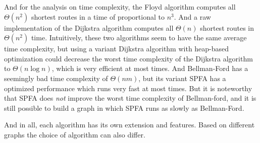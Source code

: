 \documentclass[a4paper,11pt,twocolumn]{article}
\begin{document}
And for the analysis on time complexity, the Floyd algorithm computes all $\Theta(n^2)$ shortest routes in a time of proportional to $n^3$. And a raw implementation of the Dijkstra algorithm computes all $\Theta(n)$ shortest routes in $\Theta(n^2)$ time. Intuitively, these two algorithms seem to have the same average time complexity, but using a variant Dijkstra algorithm with heap-based optimization could decrease the worst time complexity of the Dijkstra algorithm to $\Theta(n\log n)$, which is very efficient at most times. And Bellman-Ford has a seemingly bad time complexity of $\Theta(nm)$, but its variant SPFA has a optimized performance which runs very fast at most times. But it is noteworthy that SPFA does \emph{not} improve the worst time complexity of Bellman-ford, and it is still possible to build a graph in which SPFA runs as slowly as Bellman-Ford.

And in all, each algorithm has its own extension and features. Based on different graphs the choice of algorithm can also differ.
\end{document}
